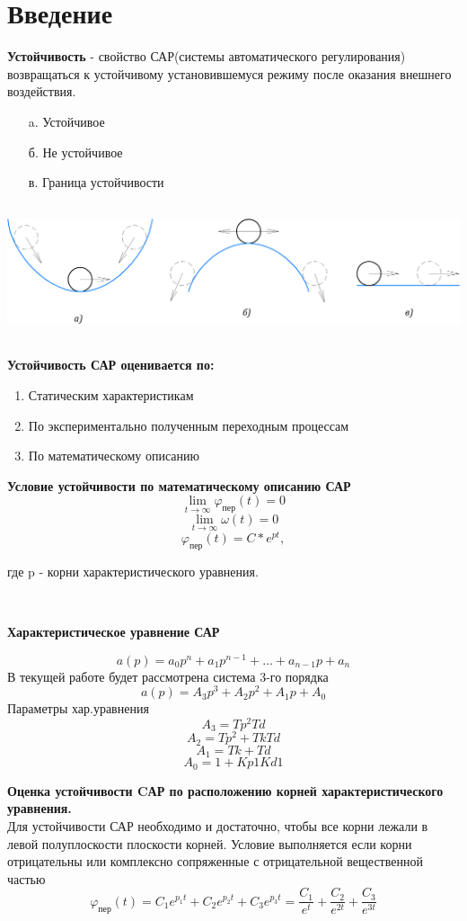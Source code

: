 \documentclass[12pt, a4paper]{report}
\begin{document}
\section*{Введение}
\textbf{Устойчивость} - свойство САР(системы автоматического регулирования) возвращаться к устойчивому установившемуся режиму после оказания внешнего воздействия. \\

\begin{enumerate}
  \item[a.] Устойчивое
  \item[б.] Не устойчивое
  \item[в.] Граница устойчивости
\end{enumerate}
\includegraphics[width=15cm, height=4cm]{condition}

\textbf{Устойчивость САР оценивается по:}
\begin{enumerate}
  \item Статическим характеристикам
  \item По экспериментально полученным переходным процессам
  \item По математическому описанию
\end{enumerate}

\textbf{Условие устойчивости по математическому описанию САР}
\[ \lim\limits_{ t\rightarrow\infty}{\varphi_{пер}(t)} = 0\]
\[ \lim\limits_{ t\rightarrow\infty}{\omega(t)} = 0\]
\[ \varphi_{пер}(t) = C * e^{pt}, \]
\centerline{где p - корни характеристического уравнения.}\\

\centerline{\textbf{Характеристическое уравнение САР}}
\begin{displaymath}
a(p) = a_{0}p^n + a_{1}p^{n-1} + \ldots + a_{n-1}p + a_{n}
\end{displaymath}
В текущей работе будет рассмотрена система 3-го порядка $$ a(p) = A_{3}p^3 + A_{2}p^2 + A_{1}p + A_{0} $$
Параметры хар.уравнения
$$ A_{3} = Tp^2Td $$
$$ A_{2} = Tp^2 + TkTd $$
$$ A_{1} = Tk+Td $$
$$ A_{0} = 1 + Kp1Kd1 $$

\newpage
\textbf{Оценка устойчивости CАР по расположению корней характеристического уравнения.} \\
Для устойчивости САР необходимо и достаточно, чтобы все корни лежали в левой полуплоскости плоскости корней.
Условие выполняется если корни отрицательны или комплексно сопряженные с отрицательной вещественной частью
\begin{displaymath}
\varphi_{\text{пер}}(t) = C_{1}e^{p_{1}t} + C_{2}e^{p_{2}t} + C_{3}e^{p_{3}t} =
\frac{C_{1}}{e^{t}} + \frac{C_{2}}{e^{2t}} + \frac{C_{3}}{e^{3t}}
\end{displaymath}
\end{document}
